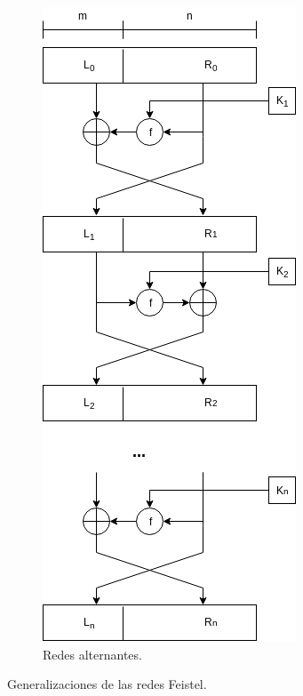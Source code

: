 \begin{figure}[H]
\begin{subfigure}{0.45\textwidth}
\begin{center}
      \includegraphics[width=0.5\linewidth]{diagramas/alternantes.png}
      \caption{Redes alternantes.}
      \label{feistel:alternantes}
    \end{center}
  \end{subfigure}
  \caption{Generalizaciones de las redes Feistel.}
  \label{feistel:generalizaciones}
\end{figure}
